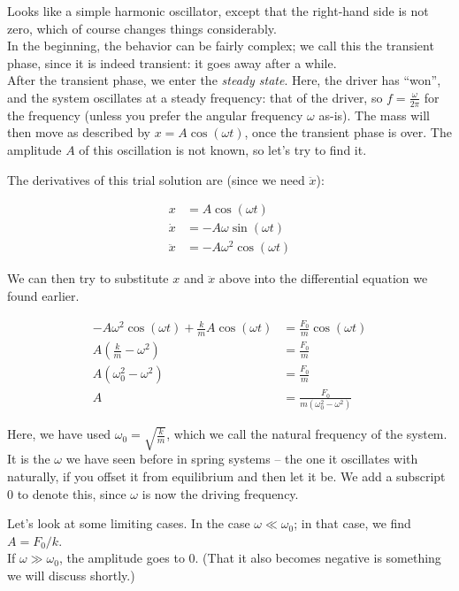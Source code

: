 Looks like a simple harmonic oscillator, except that the right-hand side is not zero, which of course changes things considerably.\\
In the beginning, the behavior can be fairly complex; we call this the transient phase, since it is indeed transient: it goes away after a while.\\
After the transient phase, we enter the \emph{steady state}. Here, the driver has ``won'', and the system oscillates at a steady frequency: that of the driver, so $f = \frac{\omega}{2 \pi}$ for the frequency (unless you prefer the angular frequency $\omega$ as-is). The mass will then move as described by $x = A \cos (\omega t)$, once the transient phase is over. The amplitude $A$ of this oscillation is not known, so let's try to find it.

The derivatives of this trial solution are (since we need $\ddot{x}$):

\begin{align}
x            &= A \cos (\omega t)\\
\dot{x}   &= -A \omega \sin(\omega t)\\
\ddot{x} &= -A \omega^2 \cos(\omega t)
\end{align}

We can then try to substitute $x$ and $\ddot{x}$ above into the differential equation we found earlier.

\begin{align}
-A \omega^2 \cos(\omega t) + \frac{k}{m} A \cos (\omega t) &=  \frac{F_0}{m} \cos (\omega t)\\
A\left(\frac{k}{m} - \omega^2\right)  &=  \frac{F_0}{m}\\
A\left(\omega_0^2 - \omega^2\right)  &=  \frac{F_0}{m}\\
A &=  \frac{F_0}{m\left(\omega_0^2 - \omega^2\right)}
\end{align}

Here, we have used $\omega_0 = \sqrt{\frac{k}{m}}$, which we call the natural frequency of the system. It is the $\omega$ we have seen before in spring systems -- the one it oscillates with naturally, if you offset it from equilibrium and then let it be. We add a subscript 0 to denote this, since $\omega$ is now the driving frequency.

Let's look at some limiting cases. In the case $\omega \ll \omega_0$; in that case, we find $A = F_0/k$.\\
If $\omega \gg \omega_0$, the amplitude goes to 0. (That it also becomes negative is something we will discuss shortly.)

